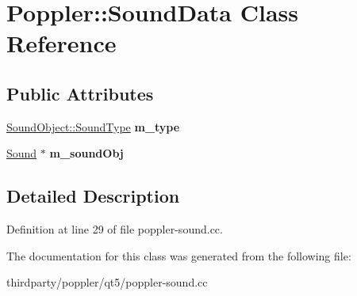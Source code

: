 \hypertarget{class_poppler_1_1_sound_data}{}\section{Poppler\+:\+:Sound\+Data Class Reference}
\label{class_poppler_1_1_sound_data}
\subsection*{Public Attributes}
\begin{DoxyCompactItemize}
\item 
\mbox{\label{class_poppler_1_1_sound_data_a36876432794adf0dbabc1b7517670431}} 
\hyperlink{class_poppler_1_1_sound_object_ac9f524c6c40abcbb1c9e09c29e020c5b}{Sound\+Object\+::\+Sound\+Type} {\bfseries m\+\_\+type}
\item 
\mbox{\label{class_poppler_1_1_sound_data_a1c0d8b7597390f9a58864e93167b45c4}} 
\hyperlink{class_sound}{Sound} $\ast$ {\bfseries m\+\_\+sound\+Obj}
\end{DoxyCompactItemize}


\subsection{Detailed Description}


Definition at line 29 of file poppler-\/sound.\+cc.



The documentation for this class was generated from the following file\+:\begin{DoxyCompactItemize}
\item 
thirdparty/poppler/qt5/poppler-\/sound.\+cc\end{DoxyCompactItemize}
